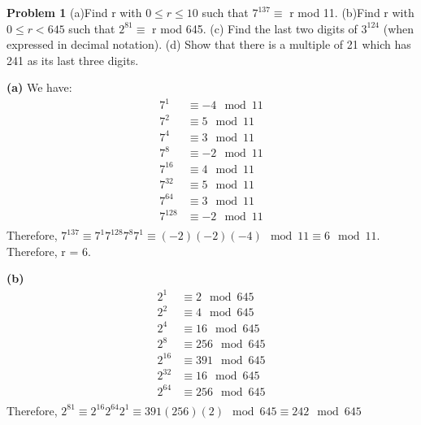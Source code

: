 \documentclass[12pt,letterpaper]{hmcpset}
\begin{document}
\begin{problem}\textbf{Problem 1} 
\newline(a)Find r with $0 \leqslant r \leqslant 10$ such that $7^{137} \equiv$ r mod 11.
\newline(b)Find r with $0 \leqslant r < 645$ such that $2^{81} \equiv$ r mod 645.
\newline(c) Find the last two digits of $3^{124}$ (when expressed in decimal notation).
\newline(d) Show that there is a multiple of 21 which has 241 as its last three digits.
\end{problem}
\begin{solution}
\textbf{(a)} We have:
\begin{align*}
7^{1}	&\equiv -4\mod 11 \\
7^{2}	&\equiv 5\mod 11 \\
7^{4}	&\equiv 3\mod 11 \\
7^{8}	&\equiv -2\mod 11 \\
7^{16}	&\equiv 4\mod 11 \\
7^{32}	&\equiv 5\mod 11 \\
7^{64}	&\equiv 3\mod 11 \\
7^{128}	&\equiv -2\mod 11 \\
\end{align*}
Therefore, $7^{137} \equiv 7^{1} 7^{128}7^{8}7^{1} \equiv (-2)(-2)(-4) \mod 11\equiv 6 \mod 11$. Therefore, r = 6. 
\end{solution}

\begin{solution}\textbf{(b)}
\begin{align*}
2^{1}	&\equiv 2\mod 645 \\
2^{2}	&\equiv 4\mod 645 \\
2^{4}	&\equiv 16\mod 645 \\
2^{8}	&\equiv 256\mod 645 \\
2^{16}	&\equiv 391\mod 645 \\
2^{32}	&\equiv 16\mod 645 \\
2^{64}	&\equiv 256\mod 645 \\
\end{align*}
Therefore, $2^{81} \equiv 2^{16}2^{64}2^{1} \equiv 391(256)(2) \mod 645 \equiv 242 \mod 645$
\end{solution}
\end{document}
